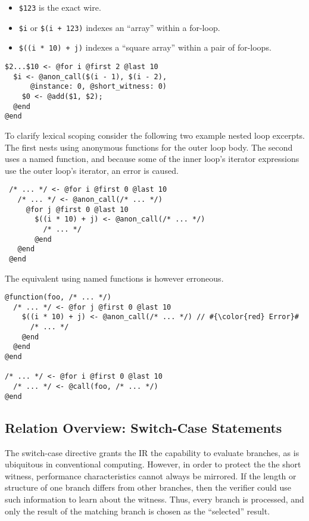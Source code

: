 \begin{itemize}
    \item \texttt{\$123} is the exact wire.
    \item \texttt{\$i} or \texttt{\$(i + 123)} indexes an ``array'' within a for-loop.
    \item \texttt{\$((i * 10) + j)}  indexes a ``square array'' within a pair of for-loops.
\end{itemize}

\begin{lstlisting}
$2...$10 <- @for i @first 2 @last 10
  $i <- @anon_call($(i - 1), $(i - 2),
      @instance: 0, @short_witness: 0)
    $0 <- @add($1, $2);
  @end
@end
\end{lstlisting}

To clarify lexical  scoping consider the following two example nested loop excerpts.
The first nests using anonymous functions for the outer loop body.
The second uses a named function, and because some of the inner loop's iterator expressions use the outer loop's iterator, an error is caused.\\

\begin{lstlisting}
 /* ... */ <- @for i @first 0 @last 10
   /* ... */ <- @anon_call(/* ... */)
     @for j @first 0 @last 10
       $((i * 10) + j) <- @anon_call(/* ... */)
         /* ... */
       @end
   @end
 @end
\end{lstlisting}

The equivalent using named functions is however erroneous.\\

\begin{lstlisting}
@function(foo, /* ... */)
  /* ... */ <- @for j @first 0 @last 10
    $((i * 10) + j) <- @anon_call(/* ... */) // #{\color{red} Error}#
      /* ... */
    @end
  @end
@end

/* ... */ <- @for i @first 0 @last 10
  /* ... */ <- @call(foo, /* ... */)
@end
\end{lstlisting}

\subsection{Relation Overview: Switch-Case Statements}\label{switch_overview}
The switch-case directive grants the IR the capability to evaluate branches, as is ubiquitous in conventional computing.
However, in order to protect the the short witness, performance characteristics cannot always be mirrored.
If the length or structure of one branch differs from other branches, then the verifier could use such information to learn about the witness.
Thus, every branch is processed, and only the result of the matching branch is chosen as the ``selected'' result. \\

